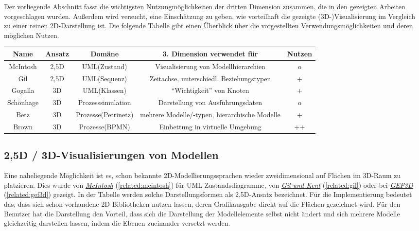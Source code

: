 \documentclass[a4paper,10pt]{sphinxmanual}
\begin{document}
Der vorliegende Abschnitt fasst die wichtigsten Nutzungmöglichkeiten der dritten Dimension zusammen, die in den gezeigten Arbeiten vorgeschlagen wurden.
Außerdem wird versucht, eine Einschätzung zu geben, wie vorteilhaft die gezeigte (3D-)Visualisierung im Vergleich zu einer reinen 2D-Darstellung ist.
Die folgende Tabelle gibt einen Überblick über die vorgestellten Verwendungsmöglichkeiten und deren möglichen Nutzen.

\begin{DUlineblock}{0em}
\item[] 
\end{DUlineblock}
\begin{tabular}{|c|c|c|c|c|}
\hline
Name & Ansatz & Domäne & 3. Dimension verwendet für & Nutzen\tabularnewline
\hline
\hline
McIntosh & 2,5D & UML(Zustand) & Visualisierung von Modellhierarchien & o\tabularnewline
\hline
Gil & 2,5D & UML(Sequenz) & Zeitachse, unterschiedl. Beziehungstypen & +\tabularnewline
\hline
Gogalla & 3D & UML(Klassen) & ``Wichtigkeit'' von Knoten & +\tabularnewline
\hline
Schönhage & 3D & Prozesssimulation & Darstellung von Ausführungsdaten & o\tabularnewline
\hline
Betz & 3D & Prozesse(Petrinetz) & mehrere Modelle/-typen, hierarchische Modelle & +\tabularnewline
\hline
Brown & 3D & Prozesse(BPMN) & Einbettung in virtuelle Umgebung & ++\tabularnewline
\hline
\end{tabular}
\begin{DUlineblock}{0em}
\item[] 
\end{DUlineblock}


\subsection{2,5D / 3D-Visualisierungen von Modellen}
\label{related:d-3d-visualisierungen-von-modellen}
Eine naheliegende Möglichkeit ist es, schon bekannte 2D-Modellierungssprachen wieder zweidimensional auf Flächen im 3D-Raum zu platzieren.
Dies wurde von {\hyperref[related:mcintosh]{\emph{McIntosh}}} (\autoref*{related:mcintosh}) für UML-Zustandsdiagramme, von {\hyperref[related:gil]{\emph{Gil und Kent}}} (\autoref*{related:gil}) oder bei {\hyperref[related:gef3d]{\emph{GEF3D}}} (\autoref*{related:gef3d}) gezeigt.
In der Tabelle werden solche Darstellungsformen als 2,5D-Ansatz bezeichnet.
Für die Implementierung bedeutet das, dass sich schon vorhandene 2D-Bibliotheken nutzen lassen, deren Grafikausgabe direkt auf die Flächen gezeichnet wird.
Für den Benutzer hat die Darstellung den Vorteil, dass sich die Darstellung der Modellelemente selbst nicht ändert und sich mehrere Modelle gleichzeitig darstellen lassen, indem die Ebenen zueinander versetzt werden.
\end{document}
